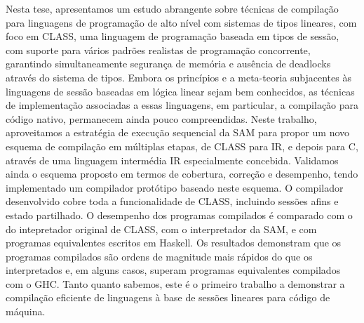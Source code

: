 \acresetall
\noindent Nesta tese, apresentamos um estudo abrangente sobre técnicas de compilação para linguagens de programação de alto nível com sistemas de tipos lineares, com foco em CLASS, uma linguagem de programação baseada em tipos de sessão, com suporte para vários padrões realistas de programação concorrente, garantindo simultaneamente segurança de memória e ausência de deadlocks através do sistema de tipos.
Embora os princípios e a meta-teoria subjacentes às linguagens de sessão baseadas em lógica linear sejam bem conhecidos, as técnicas de implementação associadas a essas linguagens, em particular, a compilação para código nativo, permanecem ainda pouco compreendidas. Neste trabalho, aproveitamos a estratégia de execução sequencial da \acf{SAM} para propor um novo esquema de compilação em múltiplas etapas, de CLASS para IR, e depois para C, através de uma linguagem intermédia IR especialmente concebida. Validamos ainda o esquema proposto em termos de cobertura, correção e desempenho, tendo implementado um compilador protótipo baseado neste esquema. O compilador desenvolvido cobre toda a funcionalidade de CLASS, incluindo sessões afins e estado partilhado. O desempenho dos programas compilados é comparado com o do intepretador original de CLASS, com o interpretador da SAM, e com programas equivalentes escritos em Haskell. Os resultados demonstram que os programas compilados são ordens de magnitude mais rápidos do que os interpretados e, em alguns casos, superam programas equivalentes compilados com o GHC. Tanto quanto sabemos, este é o primeiro trabalho a demonstrar a compilação eficiente de linguagens à base de sessões lineares para código de máquina.
